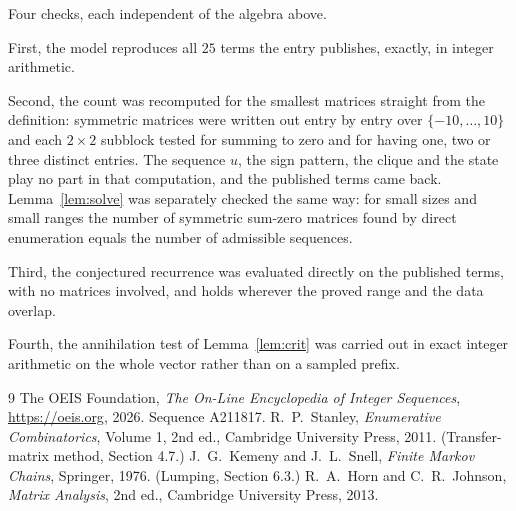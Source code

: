 \documentclass[11pt,a4paper]{article}
\theoremstyle{plain}
\theoremstyle{definition}
\begin{document}
Four checks, each independent of the algebra above.

First, the model reproduces all $25$ terms the entry publishes, exactly, in integer
arithmetic.

Second, the count was recomputed for the smallest matrices straight from the definition:
symmetric matrices were written out entry by entry over $\{-10,\dots,10\}$ and each
$2\times2$ subblock tested for summing to zero and for having one, two or three distinct entries. The
sequence $u$, the sign pattern, the clique and the state play no part in that computation, and
the published terms came back. Lemma~\ref{lem:solve} was separately checked the same way: for
small sizes and small ranges the number of symmetric sum-zero matrices found by direct
enumeration equals the number of admissible sequences.

Third, the conjectured recurrence was evaluated directly on the published terms, with no
matrices involved, and holds wherever the proved range and the data overlap.

Fourth, the annihilation test of Lemma~\ref{lem:crit} was carried out in exact integer
arithmetic on the whole vector rather than on a sampled prefix.

\begin{thebibliography}{9}
 The OEIS Foundation, \emph{The On-Line Encyclopedia of Integer
Sequences}, \url{https://oeis.org}, 2026. Sequence A211817.
 R.~P.~Stanley, \emph{Enumerative Combinatorics}, Volume 1, 2nd ed.,
Cambridge University Press, 2011. (Transfer-matrix method, Section 4.7.)
 J.~G.~Kemeny and J.~L.~Snell, \emph{Finite Markov Chains}, Springer, 1976.
(Lumping, Section 6.3.)
 R.~A.~Horn and C.~R.~Johnson, \emph{Matrix Analysis}, 2nd ed., Cambridge
University Press, 2013.
\end{thebibliography}
\end{document}
